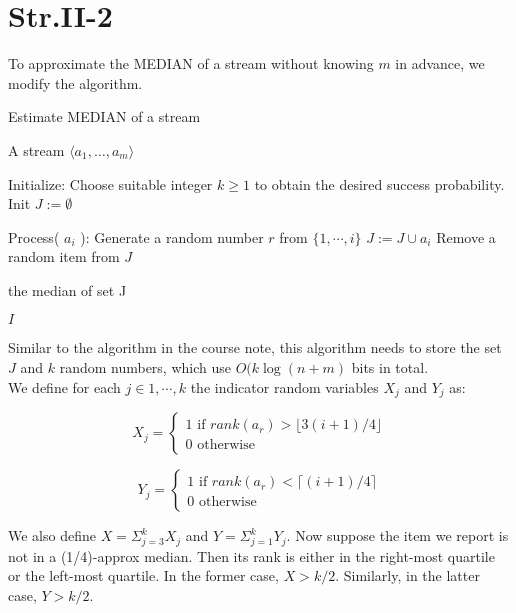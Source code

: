 \section*{Str.II-2}
To approximate the MEDIAN of a stream without knowing $m$ in advance, we modify the algorithm.

\begin{algorithm}[h]
  \caption{Estimate MEDIAN of a stream}
  \label{alg:median}
  \begin{algorithmic}
      \Require A stream $\langle a_1, \dotsc, a_m \rangle $ 

      \State Initialize:
      \State Choose suitable integer $k \geq 1$ to obtain the desired success probability.
      \State Init $J := \emptyset$

      \State Process( $a_i$ ):
      \State Generate a random number $r$ from $\{1, \cdots, i\}$
      \State $J := J \cup a_i$
      \State Remove a random item from $J$
      \EndIf
      \EndIf
      \EndFor

      \Return the median of set J
     
  \Return $I$
\end{algorithmic}
\end{algorithm}

Similar to the algorithm in the course note, this algorithm needs to store the set $J$ and $k$ random numbers, which use
$O(k\log(n+m)$ bits in total. \\ 

We define for each $j \in {1, \cdots, k}$ the indicator random variables $X_j$ and $Y_j$ as:

\[ 
  X_j = \begin{cases}
    1 \text{	if } rank(a_r) > \lfloor 3(i + 1) / 4 \rfloor \\
    0 \text{	otherwise}
  \end{cases}
\]

\[ 
  Y_j = \begin{cases}
    1 \text{	if } rank(a_r) < \lceil (i + 1) / 4 \rceil \\
    0 \text{	otherwise}
  \end{cases}
\]

We also define $X = \Sigma_{j=3}^k X_j$ and $Y = \Sigma_{j=1}^k Y_j$. Now suppose the item we report is not in a (1/4)-approx median. Then its rank is either in the right-most quartile or the left-most quartile. In the former case, $X > k/2$. Similarly, in the latter case, $Y > k/2$. \\

